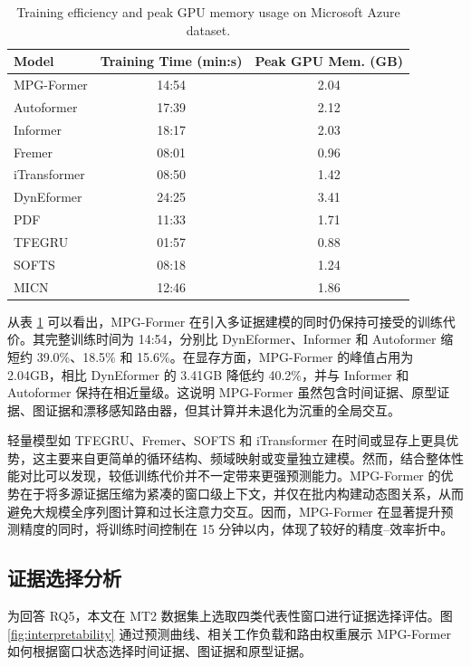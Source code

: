 \documentclass[UTF8]{ctexart}
\begin{document}
\begin{table}[t]
\centering
\caption{Training efficiency and peak GPU memory usage on Microsoft Azure dataset.}
\label{tab:azure_efficiency}
\small
\setlength{\tabcolsep}{16pt}
\renewcommand{\arraystretch}{1.05}
\begin{tabular}{lcc}
\toprule
Model & Training Time (min:s) & Peak GPU Mem. (GB) \\
\midrule
MPG-Former & 14:54 & 2.04 \\
Autoformer & 17:39 & 2.12 \\
Informer & 18:17 & 2.03 \\
Fremer & 08:01 & 0.96 \\
iTransformer & 08:50 & 1.42 \\
DynEformer & 24:25 & 3.41 \\
PDF & 11:33 & 1.71 \\
TFEGRU & 01:57 & 0.88 \\
SOFTS & 08:18 & 1.24 \\
MICN & 12:46 & 1.86 \\
\bottomrule
\end{tabular}
\end{table}

从表 \ref{tab:azure_efficiency} 可以看出，MPG-Former 在引入多证据建模的同时仍保持可接受的训练代价。其完整训练时间为 14:54，分别比 DynEformer、Informer 和 Autoformer 缩短约 39.0\%、18.5\% 和 15.6\%。在显存方面，MPG-Former 的峰值占用为 2.04GB，相比 DynEformer 的 3.41GB 降低约 40.2\%，并与 Informer 和 Autoformer 保持在相近量级。这说明 MPG-Former 虽然包含时间证据、原型证据、图证据和漂移感知路由器，但其计算并未退化为沉重的全局交互。

轻量模型如 TFEGRU、Fremer、SOFTS 和 iTransformer 在时间或显存上更具优势，这主要来自更简单的循环结构、频域映射或变量独立建模。然而，结合整体性能对比可以发现，较低训练代价并不一定带来更强预测能力。MPG-Former 的优势在于将多源证据压缩为紧凑的窗口级上下文，并仅在批内构建动态图关系，从而避免大规模全序列图计算和过长注意力交互。因而，MPG-Former 在显著提升预测精度的同时，将训练时间控制在 15 分钟以内，体现了较好的精度--效率折中。

\newpage

\subsection{证据选择分析}

为回答 RQ5，本文在 MT2 数据集上选取四类代表性窗口进行证据选择评估。图 \ref{fig:interpretability} 通过预测曲线、相关工作负载和路由权重展示 MPG-Former 如何根据窗口状态选择时间证据、图证据和原型证据。
\end{document}
